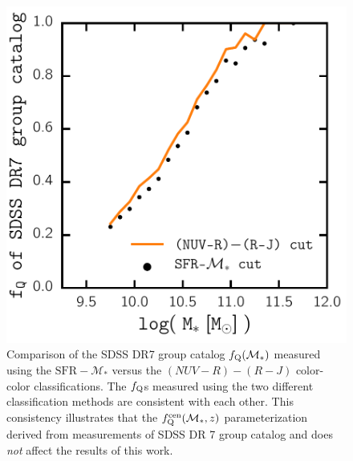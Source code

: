 \begin{figure}
\begin{center}
\includegraphics[width=\textwidth]{figs/cenq/fq_colorcolor.pdf}
\caption{Comparison of the SDSS DR7 group catalog $f_\mathrm{Q}(\mathcal{M}_*)$ 
measured using the $\mathrm{SFR} - \mathcal{M}_*$ versus the 
$(NUV - R) - (R - J)$ color-color classifications. The $f_\mathrm{Q}$s 
measured using the two different classification methods are
consistent with each other. This consistency illustrates that 
the $f_\mathrm{Q}^\mathrm{cen}(\mathcal{M}_*, z)$ parameterization derived from 
measurements of SDSS DR 7 group catalog and \cite{Tinker:2013aa} 
does {\em not} affect the results of this work.}
\label{fig:fq_colorcolor}
\end{center}
\end{figure}
